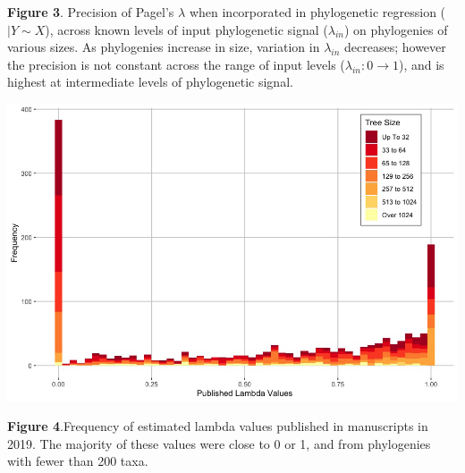 \documentclass[
]{article}
\begin{document}
\singlespacing \textbf{Figure 3}. Precision of Pagel's \(\lambda\) when
incorporated in phylogenetic regression (\(|Y\sim X\)), across known
levels of input phylogenetic signal (\(\lambda_{in}\)) on phylogenies of
various sizes. As phylogenies increase in size, variation in
\(\lambda_{in}\) decreases; however the precision is not constant across
the range of input levels (\(\lambda_{in}: 0 \to 1\)), and is highest at
intermediate levels of phylogenetic signal.

\newpage

\includegraphics[width=0.95\linewidth]{Fig4}

\singlespacing \textbf{Figure 4}.Frequency of estimated lambda values
published in manuscripts in 2019. The majority of these values were
close to 0 or 1, and from phylogenies with fewer than 200 taxa.
\end{document}
